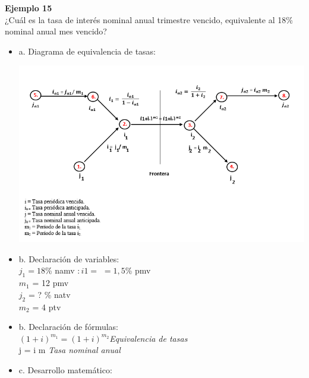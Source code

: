 \textbf{Ejemplo 15}\\

¿Cuál es la tasa de interés nominal anual trimestre vencido, equivalente al 18\% nominal anual mes vencido?

\begin{itemize}
    \item a. Diagrama de equivalencia de tasas:\\
\begin{center}
	\includegraphics[height = 9.0 cm]{general}\\
\end{center}    
	\item b. Declaración de variables: \\
	$j_{1} = 18$\% namv \Rightarrow $:{i1} =$  $= 1,5$\% pmv\\
	$m_{1}$ = 12 pmv \\
	$j_{2}$ = ? \% natv \\
    $m_{2}$ = 4 ptv \\
   
	

	\item b. Declaración de fórmulas:\\
	
	$(1+i)^{m_1} = (1+i)^{m_2}$\hspace{35 pt}\textit{Equivalencia de tasas}\\
	j = i m \hspace{90 pt}\textit{Tasa nominal anual}\\
	
	\item c. Desarrollo matemático:\\
	

\end{itemize}
